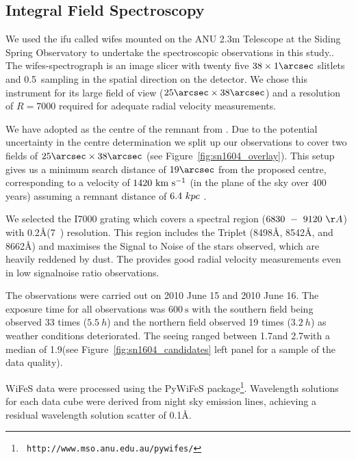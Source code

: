 \documentclass[preprint2]{aastex}
\begin{document}
\subsection{Integral Field Spectroscopy}
We used the \gls{ifu} called \gls{wifes} mounted on the ANU 2.3m Telescope at the Siding Spring Observatory  to undertake the spectroscopic observations in this study.. The \gls{wifes}-spectrograph is an image slicer with twenty five $38\times 1\arcsec$ slitlets and 0.5\arcsec\ sampling in the spatial direction on the detector. We chose this instrument for its large field of view ($25\arcsec\times38\arcsec$) and a resolution of $R=7000$ required for adequate radial velocity measurements. 

We have adopted   as the centre of the remnant from \citet{2008ApJ...689..225K}. Due to the potential uncertainty in the centre determination \citep[for a more detailed discussion about the difficulty of centre determination see Section~2.2 in][]{2012ApJ...759....7K} we split up our observations to cover two fields of $25\arcsec\times38\arcsec$ (see Figure~\ref{fig:sn1604_overlay}). This setup gives us a minimum search distance of $19\arcsec$ from the proposed centre, corresponding to a velocity of $1420~\textrm{km}~\textrm{s}^{-1}$ (in the plane of the sky over 400 years) assuming a remnant distance of $6.4~kpc$ \citep{2012A&A...537A.139C}. 



We selected the I7000 grating which covers a spectral region  ($6830~-~9120~\AA$) with 0.2\AA (7~\kms) resolution. This region includes the  Triplet (8498\AA, 8542\AA, and 8662\AA) and maximises the Signal to Noise of the stars observed, which are heavily reddened by dust. The  provides good radial velocity measurements even in low \gls{signalnoise} ratio observations.

The observations were carried out  on 2010 June 15 and 2010 June 16. The exposure time for all observations was $600~\textrm{s}$ with the southern field being observed 33 times ($5.5~h$) and the northern field observed 19 times ($3.2~h$) as weather conditions deteriorated. 
The seeing ranged between 1.7\arcsec and 2.7\arcsec with a median of 1.9\arcsec (see Figure~\ref{fig:sn1604_candidates} left panel for a sample of the data quality). 




WiFeS data were processed using the PyWiFeS package\footnote[1]{{\tt
http://www.mso.anu.edu.au/pywifes/}}.  Wavelength solutions for each
data cube were derived from night sky emission lines, achieving a
residual wavelength solution scatter of 0.1\AA.
\end{document}
